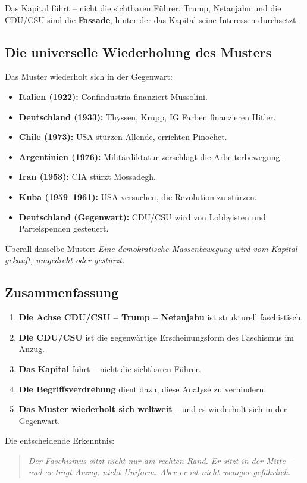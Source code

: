 Das Kapital führt – nicht die sichtbaren Führer. Trump, Netanjahu und die CDU/CSU sind die \textbf{Fassade}, hinter der das Kapital seine Interessen durchsetzt.

\subsection{Die universelle Wiederholung des Musters}

Das Muster wiederholt sich in der Gegenwart:

\begin{itemize}
    \item \textbf{Italien (1922):} Confindustria finanziert Mussolini.
    \item \textbf{Deutschland (1933):} Thyssen, Krupp, IG Farben finanzieren Hitler.
    \item \textbf{Chile (1973):} USA stürzen Allende, errichten Pinochet.
    \item \textbf{Argentinien (1976):} Militärdiktatur zerschlägt die Arbeiterbewegung.
    \item \textbf{Iran (1953):} CIA stürzt Mossadegh.
    \item \textbf{Kuba (1959--1961):} USA versuchen, die Revolution zu stürzen.
    \item \textbf{Deutschland (Gegenwart):} CDU/CSU wird von Lobbyisten und Parteispenden gesteuert.
\end{itemize}

Überall dasselbe Muster: \emph{Eine demokratische Massenbewegung wird vom Kapital gekauft, umgedreht oder gestürzt.}

\subsection{Zusammenfassung}

\begin{enumerate}
    \item \textbf{Die Achse CDU/CSU – Trump – Netanjahu} ist strukturell faschistisch.
    \item \textbf{Die CDU/CSU} ist die gegenwärtige Erscheinungsform des Faschismus im Anzug.
    \item \textbf{Das Kapital} führt – nicht die sichtbaren Führer.
    \item \textbf{Die Begriffsverdrehung} dient dazu, diese Analyse zu verhindern.
    \item \textbf{Das Muster wiederholt sich weltweit} – und es wiederholt sich in der Gegenwart.
\end{enumerate}

Die entscheidende Erkenntnis:

\begin{quote}
\emph{Der Faschismus sitzt nicht nur am rechten Rand. Er sitzt in der Mitte – und er trägt Anzug, nicht Uniform. Aber er ist nicht weniger gefährlich.}
\end{quote}